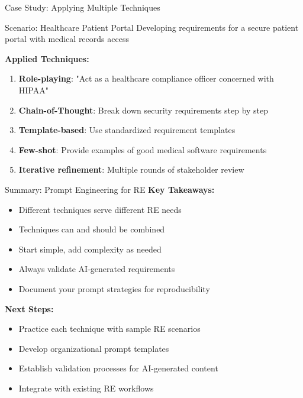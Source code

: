 \documentclass{beamer}
\begin{document}
\begin{frame}{Case Study: Applying Multiple Techniques}
    \begin{block}{Scenario: Healthcare Patient Portal}
        Developing requirements for a secure patient portal with medical records access
    \end{block}
    
    \textbf{Applied Techniques:}
    \begin{enumerate}
        \item \textbf{Role-playing}: "Act as a healthcare compliance officer concerned with HIPAA"
        \item \textbf{Chain-of-Thought}: Break down security requirements step by step
        \item \textbf{Template-based}: Use standardized requirement templates
        \item \textbf{Few-shot}: Provide examples of good medical software requirements
        \item \textbf{Iterative refinement}: Multiple rounds of stakeholder review
    \end{enumerate}
    
\end{frame}

\begin{frame}{Summary: Prompt Engineering for RE}
            \textbf{Key Takeaways:}
            \begin{itemize}
                \item Different techniques serve different RE needs
                \item Techniques can and should be combined
                \item Start simple, add complexity as needed
                \item Always validate AI-generated requirements
                \item Document your prompt strategies for reproducibility
            \end{itemize}
    
    \vspace{0.5cm}
    \textbf{Next Steps:}
    \begin{itemize}
        \item Practice each technique with sample RE scenarios
        \item Develop organizational prompt templates
        \item Establish validation processes for AI-generated content
        \item Integrate with existing RE workflows
    \end{itemize}
\end{frame}
\end{document}
